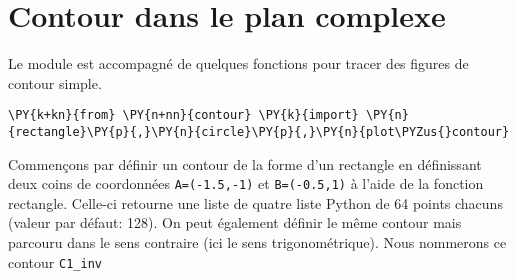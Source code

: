 \section{Contour dans le plan complexe\label{contour-dans-le-plan-complexe}}
Le module est accompagné de quelques fonctions pour tracer des figures
de contour simple.
\begin{tcolorbox}[breakable, size=fbox, boxrule=1pt, pad at break*=1mm,colback=cellbackground, colframe=cellborder]
\begin{Verbatim}[commandchars=\\\{\}]
\PY{k+kn}{from} \PY{n+nn}{contour} \PY{k}{import} \PY{n}{rectangle}\PY{p}{,}\PY{n}{circle}\PY{p}{,}\PY{n}{plot\PYZus{}contour}
\end{Verbatim}
\end{tcolorbox}

Commençons par définir un contour de la forme d'un rectangle en
définissant deux coins de coordonnées \texttt{A=(-1.5,-1)} et
\texttt{B=(-0.5,1)} à l'aide de la fonction rectangle. Celle-ci retourne
une liste de quatre liste Python de 64 points chacuns (valeur par
défaut: 128).
On peut également définir le même contour mais parcouru dans le sens
contraire (ici le sens trigonométrique). Nous nommerons ce contour
\texttt{C1\_inv}

